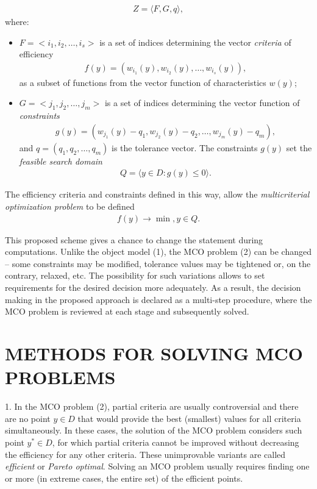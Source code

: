 \documentclass{aip-cp}
\begin{document}
\begin{eqnarray} \label{eq2}
  Z=\langle F,G,q \rangle,
\end{eqnarray}
where:
\begin{itemize}
  \item $F=<i_1,i_2,\ldots,i_s>$ is a set of indices determining the vector \textit{criteria} of efficiency
\begin{eqnarray*}
  f(y)=(w_{i_1}(y),w_{i_2}(y),\ldots,w_{i_s}(y)),
\end{eqnarray*}
as a subset of functions from the vector function of characteristics $w(y)$;
  \item $G=<j_1,j_2,\ldots,j_m>$ is a set of indices determining the vector function of \textit{constraints}  
\begin{eqnarray*}
  g(y)=(w_{j_1}(y)-q_1,w_{j_2}(y)-q_2,\ldots,w_{j_m}(y)-q_m),
\end{eqnarray*}
and $q=(q_1,q_2,\ldots,q_m )$ is the tolerance vector. The constraints $g(y)$ set the \textit{feasible search domain} 
\begin{eqnarray*}
  Q= \langle y \in D: g(y) \leq 0 \rangle .
\end{eqnarray*}
\end{itemize}

The efficiency criteria and constraints defined in this way, allow the {\it multicriterial optimization problem} to be defined
\begin{eqnarray*}
f(y) \rightarrow \min, y \in Q.
\end{eqnarray*}

This proposed scheme gives a chance to change the statement during computations. Unlike the object model (1), the MCO problem (2)  can be changed – some constraints may be modified, tolerance values may be tightened or, on the contrary, relaxed, etc. The possibility for such variations allows to set requirements for the desired decision more adequately. As a result, the decision making in the proposed approach is declared as a multi-step procedure, where the MCO problem is reviewed at each stage and subsequently solved. 

\section{METHODS FOR SOLVING MCO PROBLEMS}

1. In the MCO problem (2), partial criteria are usually controversial and there are no point $y \in D$ that would provide the best (smallest) values for all criteria simultaneously. In these cases, the solution of the MCO problem considers such point $y^* \in D$, for which partial criteria cannot be improved without decreasing the efficiency for any other criteria. These unimprovable variants are called {\it efficient} or {\it Pareto optimal}. Solving an MCO problem usually requires finding one or more (in extreme cases, the entire set) of the efficient points. \par 
\end{document}
